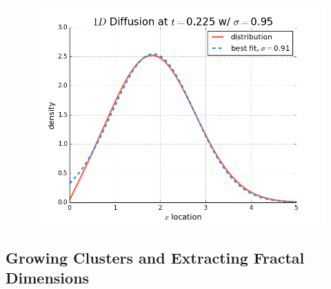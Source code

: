 \documentclass[10pt]{article}
\begin{document}
\begin{figure}[!htb]
  \caption{}\label{fig:probdensity5}
\endminipage\hfill
{}
  \includegraphics[width=\linewidth]{probdensityt2000.png}
  \caption{}\label{fig:probdensity6}
\endminipage\hfill
\end{figure}

\subsection{Growing Clusters and Extracting Fractal Dimensions}
\label{sec:clustersandfractals}
\end{document}
